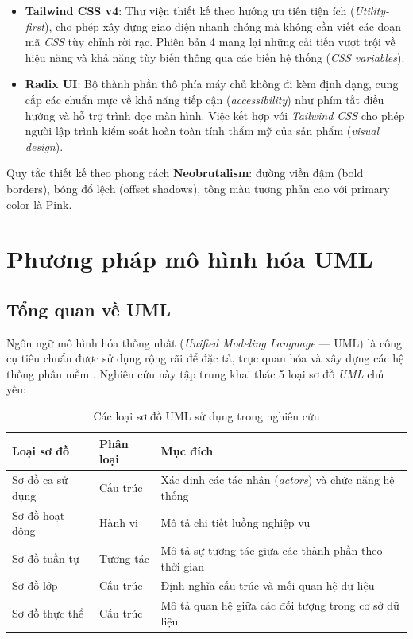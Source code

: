 \documentclass[13pt,a4paper,oneside]{extreport}
\numberwithin{equation}{chapter}
\numberwithin{figure}{chapter}
\numberwithin{table}{chapter}
\begin{document}
\begin{itemize}
    \item \textbf{Tailwind CSS v4}: Thư viện thiết kế theo hướng ưu tiên tiện ích (\textit{Utility-first}), cho phép xây dựng giao diện nhanh chóng mà không cần viết các đoạn mã \textit{CSS} tùy chỉnh rời rạc. Phiên bản 4 mang lại những cải tiến vượt trội về hiệu năng và khả năng tùy biến thông qua các biến hệ thống (\textit{CSS variables}).
    \item \textbf{Radix UI}: Bộ thành phần thô phía máy chủ không đi kèm định dạng, cung cấp các chuẩn mực về khả năng tiếp cận (\textit{accessibility}) như phím tắt điều hướng và hỗ trợ trình đọc màn hình. Việc kết hợp với \textit{Tailwind CSS} cho phép người lập trình kiểm soát hoàn toàn tính thẩm mỹ của sản phẩm (\textit{visual design}).
\end{itemize}

Quy tắc thiết kế theo phong cách \textbf{Neobrutalism}: đường viền đậm (bold borders), bóng đổ lệch (offset shadows), tông màu tương phản cao với primary color là Pink.

\section{Phương pháp mô hình hóa UML}

\subsection{Tổng quan về UML}

Ngôn ngữ mô hình hóa thống nhất (\textit{Unified Modeling Language} — UML) là công cụ tiêu chuẩn được sử dụng rộng rãi để đặc tả, trực quan hóa và xây dựng các hệ thống phần mềm \cite{ref-uml}. Nghiên cứu này tập trung khai thác 5 loại sơ đồ \textit{UML} chủ yếu:

\begin{table}[H]
\centering
\caption{Các loại sơ đồ UML sử dụng trong nghiên cứu}
\begin{tabular}{|p{3.5cm}|p{3.5cm}|p{6cm}|}
\hline
\textbf{Loại sơ đồ} & \textbf{Phân loại} & \textbf{Mục đích} \\
\hline
Sơ đồ ca sử dụng & Cấu trúc & Xác định các tác nhân (\textit{actors}) và chức năng hệ thống \\
\hline
Sơ đồ hoạt động & Hành vi & Mô tả chi tiết luồng nghiệp vụ \\
\hline
Sơ đồ tuần tự & Tương tác & Mô tả sự tương tác giữa các thành phần theo thời gian \\
\hline
Sơ đồ lớp & Cấu trúc & Định nghĩa cấu trúc và mối quan hệ dữ liệu \\
\hline
Sơ đồ thực thể & Cấu trúc & Mô tả quan hệ giữa các đối tượng trong cơ sở dữ liệu \\
\hline
\end{tabular}
\end{table}
\end{document}
